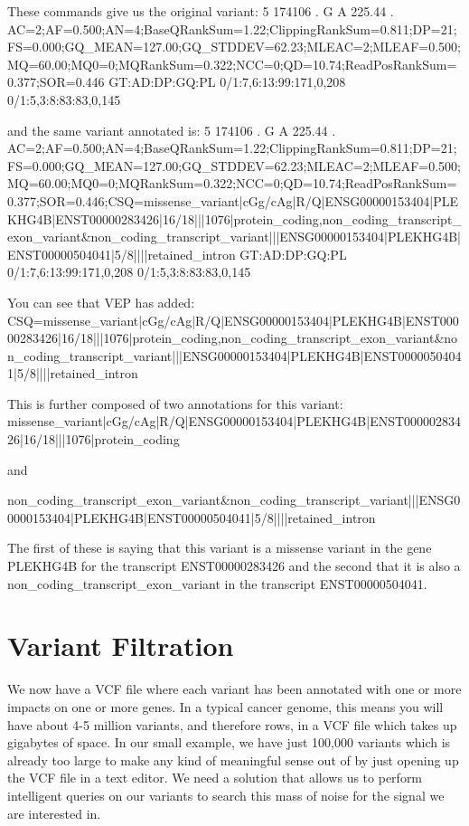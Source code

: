 These commands give us the original variant:
5	174106	.	G	A	225.44	.	AC=2;AF=0.500;AN=4;BaseQRankSum=1.22;ClippingRankSum=0.811;DP=21;FS=0.000;GQ_MEAN=127.00;GQ_STDDEV=62.23;MLEAC=2;MLEAF=0.500;MQ=60.00;MQ0=0;MQRankSum=0.322;NCC=0;QD=10.74;ReadPosRankSum=0.377;SOR=0.446	GT:AD:DP:GQ:PL	0/1:7,6:13:99:171,0,208	0/1:5,3:8:83:83,0,145

and the same variant annotated is:
5	174106	.	G	A	225.44	.	AC=2;AF=0.500;AN=4;BaseQRankSum=1.22;ClippingRankSum=0.811;DP=21;FS=0.000;GQ\_MEAN=127.00;GQ\_STDDEV=62.23;MLEAC=2;MLEAF=0.500;MQ=60.00;MQ0=0;MQRankSum=0.322;NCC=0;QD=10.74;ReadPosRankSum=0.377;SOR=0.446;CSQ=missense\_variant|cGg/cAg|R/Q|ENSG00000153404|PLEKHG4B|ENST00000283426|16/18|||1076|protein\_coding,non\_coding\_transcript\_exon\_variant&non\_coding\_transcript\_variant|||ENSG00000153404|PLEKHG4B|ENST00000504041|5/8||||retained\_intron	GT:AD:DP:GQ:PL	0/1:7,6:13:99:171,0,208	0/1:5,3:8:83:83,0,145

You can see that VEP has added:
CSQ=missense\_variant|cGg/cAg|R/Q|ENSG00000153404|PLEKHG4B|ENST00000283426|16/18|||1076|protein\_coding,non\_coding\_transcript\_exon\_variant&non\_coding\_transcript\_variant|||ENSG00000153404|PLEKHG4B|ENST00000504041|5/8||||retained\_intron

This is further composed of two annotations for this variant:
missense\_variant|cGg/cAg|R/Q|ENSG00000153404|PLEKHG4B|ENST00000283426|16/18|||1076|protein\_coding

and

non\_coding\_transcript\_exon\_variant&non\_coding\_transcript\_variant|||ENSG00000153404|PLEKHG4B|ENST00000504041|5/8||||retained\_intron

The first of these is saying that this variant is a missense variant in the gene PLEKHG4B for the transcript ENST00000283426 and the second that it is also a non\_coding\_transcript\_exon\_variant in the transcript ENST00000504041.


\section{Variant Filtration}

We now have a VCF file where each variant has been annotated with one or more impacts on one or more genes. In a typical cancer genome, this means you will have about 4-5 million variants, and therefore rows, in a VCF file which takes up gigabytes of space. In our small example, we have just 100,000 variants which is already too large to make any kind of meaningful sense out of by just opening up the VCF file in a text editor. We need a solution that allows us to perform intelligent queries on our variants to search this mass of noise for the signal we are interested in.

